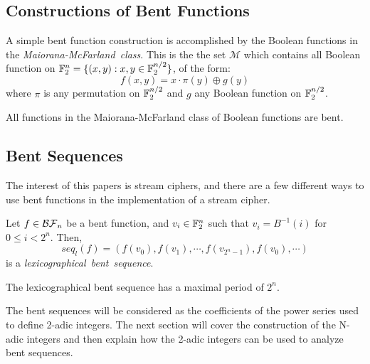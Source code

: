 
\subsection{Constructions of Bent Functions}
\par A simple bent function construction is accomplished by the Boolean
functions in the {\em Maiorana-McFarland\ class}. This is the the set
$\mathcal{M}$ which contains all Boolean function on
$\mathbb{F}_2^n=\{(x,y):x,y\in\mathbb{F}_2^{n/2}\}$, of the form:
  \[
  f(x,y)=x\cdot\pi(y)\oplus g(y)
  \]
where $\pi$ is any permutation on $\mathbb{F}_2^{n/2}$ and $g$ any Boolean
function on $\mathbb{F}_2^{n/2}$.

\par All functions in the Maiorana-McFarland class of Boolean functions are
bent.

\subsection{Bent Sequences}
\par The interest of this papers is stream ciphers, and there are a few
different ways to use bent functions in the implementation of a stream
cipher.

\begin{definition}\label{def:lex-bent-seq}
  Let $f\in\mathcal{BF}_n$ be a bent function, and $v_i\in\mathbb{F}_2^n$ such that
  $v_i=B^{-1}(i)$ for $0\leq i<2^n$. Then,
  \begin{equation}
    seq_l(f)=(f(v_0),f(v_1),\cdots,f(v_{2^n-1}),f(v_0),\cdots)
  \end{equation}
  is a {\em lexicographical\ bent\ sequence}.
\end{definition}

\begin{lemma}
The lexicographical bent sequence has a maximal period of $2^n$.
\end{lemma}

\par The bent sequences will be considered as the coefficients of the power
series used to define 2-adic integers. The next section will cover the
construction of the N-adic integers and then explain how the 2-adic integers
can be used to analyze bent sequences.
